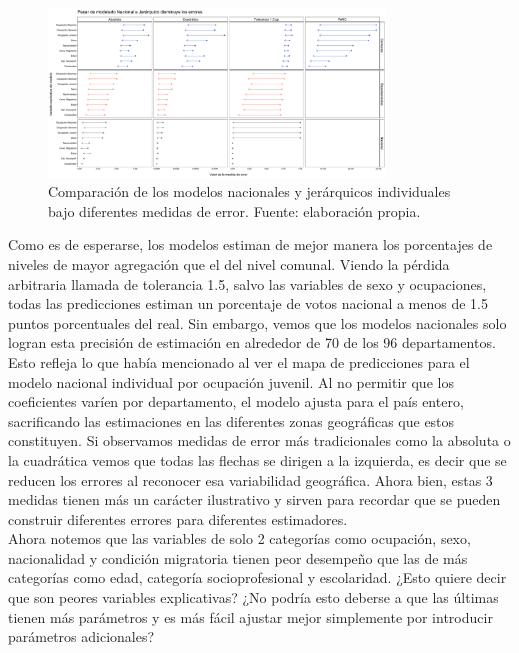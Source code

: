 \begin{figure}[h]
	\centering
	\includegraphics[width = 0.8\textwidth]{Figs/Modelado/Graf_Errores_Modelos_Individuales}
	\caption{Comparación de los modelos nacionales y jerárquicos individuales bajo diferentes medidas de error. Fuente: elaboración propia.}
	\label{fig:Errores_Modelos_Individuales}
\end{figure} 

Como es de esperarse, los modelos estiman de mejor manera los porcentajes de niveles de mayor agregación que el del nivel comunal. Viendo la pérdida arbitraria llamada de tolerancia 1.5, salvo las variables de sexo y ocupaciones, todas las predicciones estiman un porcentaje de votos nacional a menos de 1.5 puntos porcentuales del real. Sin embargo, vemos que los modelos nacionales solo logran esta precisión de estimación en alrededor de 70 de los 96 departamentos.\\ 

Esto refleja lo que había mencionado al ver el mapa de predicciones para el modelo nacional individual por ocupación juvenil. Al no permitir que los coeficientes varíen por departamento, el modelo ajusta para el país entero, sacrificando las estimaciones en las diferentes zonas geográficas que estos constituyen. Si observamos medidas de error más tradicionales como la absoluta o la cuadrática vemos que todas las flechas se dirigen a la izquierda, es decir que se reducen los errores al reconocer esa variabilidad geográfica. Ahora bien, estas 3 medidas tienen más un carácter ilustrativo y sirven para recordar que se pueden construir diferentes errores para diferentes estimadores.\\ 

Ahora notemos que las variables de solo 2 categorías como ocupación, sexo, nacionalidad y condición migratoria tienen peor desempeño que las de más categorías como edad, categoría socioprofesional y escolaridad. ¿Esto quiere decir que son peores variables explicativas? ¿No podría esto deberse a que las últimas tienen más parámetros y es más fácil ajustar mejor simplemente por introducir parámetros adicionales?

